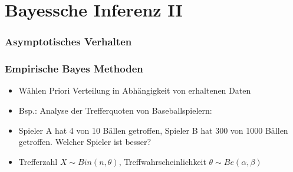 \documentclass[aspectratio=169,xcolor=dvipsnames]{beamer}
\begin{document}
\section{Bayessche Inferenz II}

\begin{frame}
\frametitle{Asymptotisches Verhalten}
\end{frame}

\begin{frame}
\frametitle{Empirische Bayes Methoden}
\begin{itemize}
\item<1-> Wählen Priori Verteilung in Abhängigkeit von erhaltenen Daten
\item<2-> Bsp.: Analyse der Trefferquoten von Baseballspielern:
\item<3-> Spieler A hat 4 von 10 Bällen getroffen, Spieler B hat 300 von 1000 Bällen getroffen. Welcher Spieler ist besser?
\item<4-> Trefferzahl $X\sim Bin(n,\theta)$, Treffwahrscheinlichkeit $\theta\sim Be(\alpha,\beta)$
\end{itemize}
\end{frame}
\end{document}
